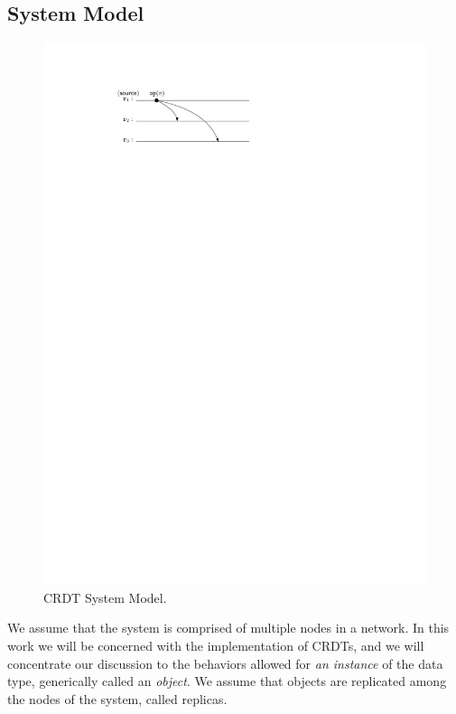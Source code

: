 \subsection{System Model}
\begin{figure}
\vspace{-4mm}
  \centering
  \includegraphics[scale=.7]{figures/sys-mod}
  \caption{CRDT System Model.}
  \label{fig:sys-mod}
\end{figure}

We assume that the system is comprised of multiple nodes in a network.
In this work we will be concerned with the implementation of CRDTs,
and we will concentrate our discussion to the behaviors
allowed for \emph{an instance} of the data type, generically called an
\emph{object}.
We assume that objects are replicated among the nodes of the system,
called replicas.

